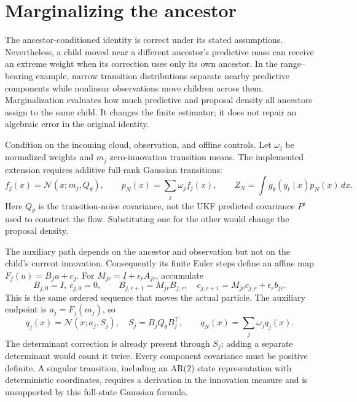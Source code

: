 \section{Marginalizing the ancestor}
\label{sec:bf-pfpf-marginal-weights}

The ancestor-conditioned identity is correct under its stated assumptions.
Nevertheless, a child moved near a different ancestor's predictive mass can
receive an extreme weight when its correction uses only its own ancestor.
In the range--bearing example, narrow transition distributions separate nearby
predictive components while nonlinear observations move children across them.
Marginalization evaluates how much predictive and proposal density all
ancestors assign to the same child. It changes the finite estimator; it does
not repair an algebraic error in the original identity.

Condition on the incoming cloud, observation, and offline controls. Let
$\omega_j$ be normalized weights and $m_j$ zero-innovation transition means.
The implemented extension requires additive full-rank Gaussian transitions:
\begin{equation}
 f_j(x)=\mathcal N(x;m_j,Q_\theta),\qquad
 p_N(x)=\sum_j\omega_j f_j(x),\qquad
 Z_N=\int g_\theta(y_t\mid x)p_N(x)\,dx.
 \label{eq:bf-marginal-predictive}
\end{equation}
Here $Q_\theta$ is the transition-noise covariance, not the UKF predicted
covariance $P^j$ used to construct the flow. Substituting one for the other
would change the proposal density.

The auxiliary path depends on the ancestor and observation but not on the
child's current innovation. Consequently its finite Euler steps define an
affine map $F_j(u)=B_ju+c_j$. For $M_{jr}=I+\epsilon_r A_{jr}$, accumulate
\begin{equation}
 B_{j,0}=I,\ c_{j,0}=0,\qquad
 B_{j,r+1}=M_{jr}B_{j,r},\quad
 c_{j,r+1}=M_{jr}c_{j,r}+\epsilon_r b_{jr}.
 \label{eq:bf-marginal-affine}
\end{equation}
This is the same ordered sequence that moves the actual particle. The
auxiliary endpoint is $a_j=F_j(m_j)$, so
\begin{equation}
 q_j(x)=\mathcal N(x;a_j,S_j),\quad S_j=B_jQ_\theta B_j^\top,\qquad
 q_N(x)=\sum_j\omega_jq_j(x).
 \label{eq:bf-marginal-proposal}
\end{equation}
The determinant correction is already present through $S_j$; adding a separate
determinant would count it twice. Every component covariance must be positive
definite. A singular transition, including an AR(2) state representation with
deterministic coordinates, requires a derivation in the innovation measure
and is unsupported by this full-state Gaussian formula.

